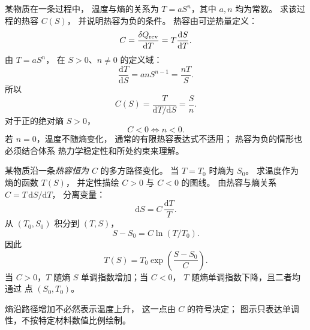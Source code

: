 某物质在一条过程中，
温度与熵的关系为
$T=aS^n$，其中 $a,n$ 均为常数。
求该过程的热容 $C(S)$，
并说明热容为负的条件。
\exsolution
热容由可逆热量定义：
\[
C=\frac{\delta Q_{\rm rev}}{\mathrm dT}
=T\frac{\mathrm dS}{\mathrm dT}.
\]
由 $T=aS^n$，
在 $S>0$、$n\ne0$ 的定义域：
\[
\frac{\mathrm dT}{\mathrm dS}
=anS^{n-1}=\frac{nT}{S}.
\]
所以
\[
\boxed{C(S)=\frac{T}{\mathrm dT/\mathrm dS}
=\frac{S}{n}}.
\]
对于正的绝对熵 $S>0$，
\[
\boxed{C<0\iff n<0}.
\]
\excheck 若 $n=0$，温度不随熵变化，
通常的有限热容表达式不适用；
热容为负的情形也必须结合体系
热力学稳定性和所处约束来理解。

某物质沿一条\emph{热容恒为 $C$}
的多方路径变化。
当 $T=T_0$ 时熵为 $S_0$。
求温度作为熵的函数 $T(S)$，
并定性描绘 $C>0$ 与 $C<0$ 的图线。
\exsolution
由热容与熵关系
$C=T\,\mathrm dS/\mathrm dT$，
分离变量：
\[
\mathrm dS=C\,\frac{\mathrm dT}{T}.
\]
从 $(T_0,S_0)$ 积分到 $(T,S)$，
\[
S-S_0=C\ln(T/T_0).
\]
因此
\[
\boxed{T(S)=T_0
\exp\left(\frac{S-S_0}{C}\right)}.
\]
当 $C>0$，$T$ 随熵 $S$
单调指数增加；当 $C<0$，
$T$ 随熵单调指数下降，且二者均通过
点 $(S_0,T_0)$。
\begin{center}
\end{center}
\excheck 熵沿路径增加不必然表示温度上升，
这一点由 $C$ 的符号决定；
图示只表达单调性，不按特定材料数值比例绘制。
